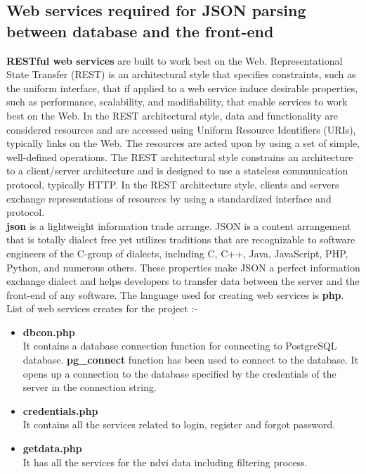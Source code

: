 \subsection{Web services required for JSON parsing between database and the front-end}


\textbf{RESTful web services} are built to work best on the Web. Representational State Transfer (REST) is an architectural style that specifies constraints, such as the uniform interface, that if applied to a web service induce desirable properties, such as performance, scalability, and modifiability, that enable services to work best on the Web. In the REST architectural style, data and functionality are considered resources and are accessed using Uniform Resource Identifiers (URIs), typically links on the Web. The resources are acted upon by using a set of simple, well-defined operations. The REST architectural style constrains an architecture to a client/server architecture and is designed to use a stateless communication protocol, typically HTTP. In the REST architecture style, clients and servers exchange representations of resources by using a standardized interface and protocol. \\

\textbf{\gls{json}} is a lightweight information trade arrange. JSON is a content arrangement that is totally dialect free yet utilizes traditions that are recognizable to software engineers of the C-group of dialects, including C, C++, Java, JavaScript, PHP, Python, and numerous others. These properties make JSON a perfect information exchange dialect and helps developers to transfer data between the server and the front-end of any software. The language used for creating web services is \textbf{\gls{php}}. \\

List of web services creates for the project :-

\begin{itemize}
    \item \textbf{dbcon.php} \\
    It contains a database connection function for connecting to PostgreSQL database. \textbf{pg\_connect} function has been used to connect to the database. It opens up a connection to the database specified by the credentials of the server in the connection string. \\
    
    \item \textbf{credentials.php} \\
    It contains all the services related to login, register and forgot password. \\
    
    \item \textbf{getdata.php} \\
    It has all the services for the ndvi data including filtering process. \\
\end{itemize}

